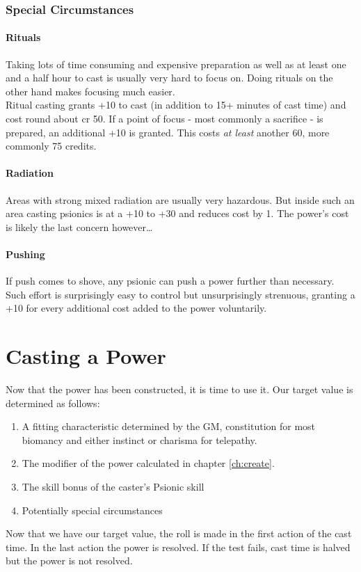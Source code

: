 \documentclass[12pt,a4paper,openany]{book}
\begin{document}
	\subsection{Special Circumstances}
	\subsubsection{Rituals}
	Taking lots of time consuming and expensive preparation as well as at least one and a half hour to cast is usually very hard to focus on. Doing rituals on the other hand makes focusing much easier.\\
	Ritual casting grants +10 to cast (in addition to 15+ minutes of cast time) and cost round about cr 50. If a point of focus - most commonly a sacrifice - is prepared, an additional +10 is granted. This costs \emph{at least} another 60, more commonly 75 credits.
	\subsubsection{Radiation}
	Areas with strong mixed radiation are usually very hazardous. But inside such an area casting psionics is at a +10 to +30 and reduces cost by 1. The power’s cost is likely the last concern however…
	\subsubsection{Pushing}
	If push comes to shove, any psionic can push a power further than necessary. Such effort is surprisingly easy to control but unsurprisingly strenuous, granting a +10 for every additional cost added to the power voluntarily.

	\chapter{Casting a Power}
	Now that the power has been constructed, it is time to use it. Our target value is determined as follows:
	\begin{enumerate}
		\item A fitting characteristic determined by the GM, constitution for most biomancy and either instinct or charisma for telepathy.
		\item The modifier of the power calculated in chapter \ref{ch:create}.
		\item The skill bonus of the caster's Psionic skill
		\item Potentially special circumstances
	\end{enumerate}
	Now that we have our target value, the roll is made in the first action of the cast time. In the last action the power is resolved. If the test fails, cast time is halved but the power is not resolved.
\end{document}
